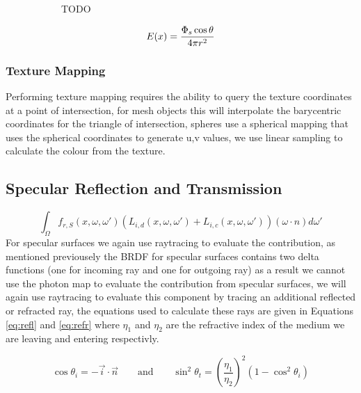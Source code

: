\begin{figure}
	\centering
	\begin{subfigure}[c]{0.4\textwidth}
	TODO
	\end{subfigure}
	\begin{subfigure}[b]{0.4\textwidth}
		\begin{equation}
		\label{eq:point_light_radiance}
		\centering
			E(x) = \frac
			{
				\Phi_s \cos{\theta}
			}
			{
				4 \pi r^2
			}
		\end{equation}
	\end{subfigure}
\end{figure}


\subsubsection{Texture Mapping}
Performing texture mapping requires the ability to query the texture coordinates at a point of intersection, for mesh objects this
will interpolate the barycentric coordinates for the triangle of intersection, spheres use a spherical mapping that uses the
spherical coordinates to generate u,v values, we use linear sampling to calculate the colour from the texture.

\subsection{Specular Reflection and Transmission}
\begin{equation*}
	\int_{\Omega}
	f_{r,S}(x, \omega, \omega')
	(
		L_{i,d}(x,\omega,\omega')
		+
		L_{i,c}(x,\omega,\omega')
	)
	(\omega \cdot n)d\omega'
\end{equation*}
For specular surfaces we again use raytracing to evaluate the contribution, as mentioned previousely the BRDF for specular surfaces
contains two delta functions (one for incoming ray and one for outgoing ray) as a result we cannot use the photon map to evaluate
the contribution from specular surfaces, we will again use raytracing to evaluate this component by tracing an additional reflected
or refracted ray, the equations used to calculate these rays are given in Equations \eqref{eq:refl} and \eqref{eq:refr} where
$\eta_1$ and $\eta_2$ are the refractive index of the medium we are leaving and entering respectivly.

\begin{equation}
\cos{\theta_i} = - \vec{i} \cdot \vec{n}
\qquad\text{and}\qquad
\sin^2\theta_t = \left(\frac{\eta_1}{\eta_2}\right)^2(1 - \cos^2\theta_i)
\end{equation}

